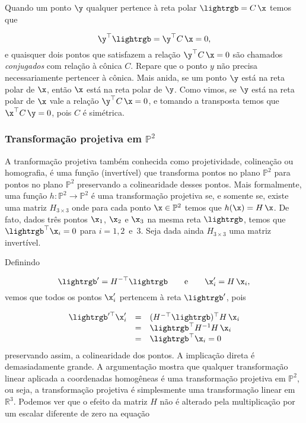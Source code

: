 
Quando um ponto $\y$ qualquer pertence à reta polar $\lightrgb=C\,\x$ temos que 

\begin{equation*}
\y^\top\lightrgb=\y^\top C\,\x=0,
\end{equation*}
e quaisquer dois pontos que satisfazem a relação $\y^\top C\,\x=0$ são chamados \textit{conjugados} com relação à cônica $C$. Repare que o ponto $y$ não precisa necessariamente pertencer à cônica. Mais anida, se um ponto $\y$ está na reta polar de $\x$, então $\x$ está na reta polar de $\y$. Como vimos, se $\y$ está na reta polar de $\x$ vale a relação $\y^\top C\,\x=0$, e tomando a transposta temos que $\x^\top C\,\y=0$, pois $C$ é simétrica. 


\subsubsection{Transformação projetiva em $\mathbb{P}^2$}\label{sec.trans-proj-H}

A tranformação projetiva também conhecida como projetividade, colineação ou homografia,  é uma função (invertível) que transforma pontos no plano $\mathbb{P}^2$ para pontos no plano $\mathbb{P}^2$ preservando a colinearidade desses pontos. Mais formalmente, uma função $h:\mathbb{P}^2\rightarrow\mathbb{P}^2$ é uma transformação projetiva se, e somente se, existe uma matriz $H_{3\times3}$ onde para cada ponto $\x\in\mathbb{P}^2$ temos que $h(\x)=H\,\x$. De fato, dados três pontos $\x_1$, $\x_2$ e $\x_3$ na mesma reta $\lightrgb$, temos que $\lightrgb^\top\x_i=0$ para $i=1,2 \,\,\,\text{e}\,\,\, 3$. Seja dada ainda $H_{3\times3}$ uma matriz invertível.

Definindo

\begin{equation*}
\lightrgb'=H^{-\top}\lightrgb \qquad\text{e}\qquad \x'_i=H\,\x_i,
\end{equation*}
vemos que todos os pontos $\x'_i$ pertencem à reta $\lightrgb'$, pois

\begin{equation*}
\begin{array}{rcl}
\lightrgb'^\top\x'_i&=&(H^{-\top}\lightrgb)^\top H\,\x_i\\
&=&\lightrgb^\top H^{-1}H\,\x_i\\
&=&\lightrgb^\top\x_i=0
\end{array}
\end{equation*}
preservando assim, a colinearidade dos pontos. A implicação direta é demasiadamente grande. A argumentação mostra que qualquer transformação linear aplicada a coordenadas homogêneas é uma transformação projetiva em $\mathbb{P}^2$, ou seja, a transformação projetiva é simplesmente uma transformação linear em $\mathbb{R}^3$. Podemos ver que o efeito da matriz $H$ não é alterado pela multiplicação por um escalar diferente de zero na equação

